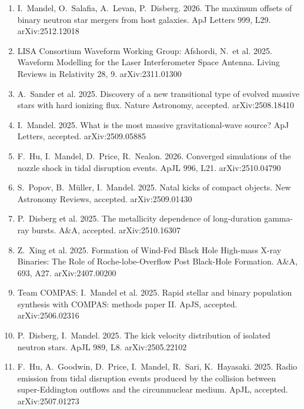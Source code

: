 \documentclass[margin,line]{res}
\begin{document}
\begin{resume}
\begin{enumerate}
\item I.~Mandel, O.~Salafia, A.~Levan, P.~Disberg. 2026. The maximum offsets of binary neutron star mergers from host galaxies. ApJ Letters 999, L29.  arXiv:2512.12018

\item LISA Consortium Waveform Working Group: Afshordi, N.~et al. 2025. Waveform Modelling for the Laser Interferometer Space Antenna.  Living Reviews in Relativity 28, 9.  arXiv:2311.01300

\item A.~Sander et al. 2025. Discovery of a new transitional type of evolved massive stars with hard ionizing flux.  Nature Astronomy, accepted.  arXiv:2508.18410

\item I.~Mandel.  2025.  What is the most massive gravitational-wave source?  ApJ Letters, accepted.  arXiv:2509.05885

\item F.~Hu, I.~Mandel, D.~Price, R.~Nealon.  2026.  Converged simulations of the nozzle shock in tidal disruption events.  ApJL 996, L21.  arXiv:2510.04790

\item S.~Popov, B.~M\"{u}ller, I.~Mandel. 2025. Natal kicks of compact objects.  New Astronomy Reviews, accepted.  arXiv:2509.01430

\item P.~Disberg et al.  2025.  The metallicity dependence of long-duration gamma-ray bursts.  A\&A, accepted.  arXiv:2510.16307

\item Z.~Xing et al. 2025. Formation of Wind-Fed Black Hole High-mass X-ray Binaries: The Role of Roche-lobe-Overflow Post Black-Hole Formation.  A\&A, 693, A27.  arXiv:2407.00200

\item Team COMPAS: I.~Mandel et al.  2025. Rapid stellar and binary population synthesis with COMPAS: methods paper II.  ApJS, accepted.  arXiv:2506.02316

\item P.~Disberg, I.~Mandel.  2025.  The kick velocity distribution of isolated neutron stars.  ApJL 989, L8.  arXiv:2505.22102

\item F.~Hu, A.~Goodwin, D.~Price, I.~Mandel, R.~Sari, K.~Hayasaki.  2025.  Radio emission from tidal disruption events produced by the collision between super-Eddington outflows and the circumnuclear medium.  ApJL, accepted. arXiv:2507.01273


\end{enumerate}
\end{resume}
\end{document}

